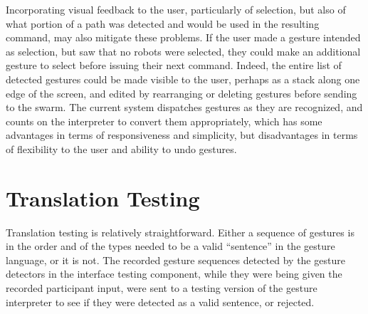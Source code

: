 Incorporating visual feedback to the user, particularly of selection, but also of what portion of a path was detected and would be used in the resulting command, may also mitigate these problems. 
If the user made a gesture intended as selection, but saw that no robots were selected, they could make an additional gesture to select before issuing their next command. 
Indeed, the entire list of detected gestures could be made visible to the user, perhaps as a stack along one edge of the screen, and edited by rearranging or deleting gestures before sending to the swarm. 
The current system dispatches gestures as they are recognized, and counts on the interpreter to convert them appropriately, which has some advantages in terms of responsiveness and simplicity, but disadvantages in terms of flexibility to the user and ability to undo gestures. 

\section{Translation Testing}

Translation testing is relatively straightforward. 
Either a sequence of gestures is in the order and of the types needed to be a valid ``sentence'' in the gesture language, or it is not. 
The recorded gesture sequences detected by the gesture detectors in the interface testing component, while they were being given the recorded participant input, were sent to a testing version of the gesture interpreter to see if they were detected as a valid sentence, or rejected. 




%
